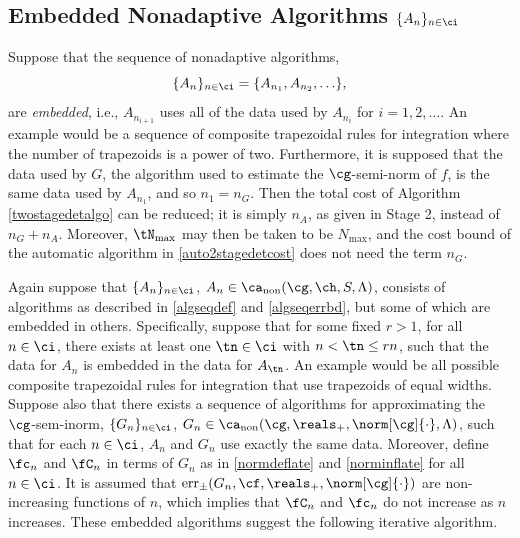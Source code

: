 \documentclass[]{elsarticle}
\DeclareMathOperator{\fix}{non}
\DeclareMathOperator{\err}{err}
\theoremstyle{definition}
\theoremstyle{remark}
\begin{document}
\subsection{Embedded Nonadaptive Algorithms $\{A_n\}_{n \in \ci}$}

Suppose that the sequence of nonadaptive algorithms, 
\[
\{A_n\}_{n \in \ci} = \{A_{n_1}, A_{n_2}, \ldots \}, 
\]
are \emph{embedded}, i.e., $A_{n_{i+1}}$ uses all of the data used by $A_{n_{i}}$ for $i=1, 2, \ldots$.  An example would be a sequence of composite trapezoidal rules for integration where the number of trapezoids is a power of two. Furthermore, it is supposed that the data used by $G$, the algorithm used to estimate the $\cg$-semi-norm of $f$, is the same data used by $A_{n_1}$, and so $n_1=n_G$.  Then the total cost of Algorithm \ref{twostagedetalgo} can be reduced; it is simply $n_A$, as given in Stage 2, instead of $n_G+n_A$.  Moreover, $\tN_{\max}$ may then be taken to be $N_{\max}$, and the cost bound of the automatic algorithm in \eqref{auto2stagedetcost} does not need the term $n_G$.

Again suppose that $\{A_n\}_{n \in \ci}$, $A_n  \in \ca_{\fix}(\cg,\ch,S,\Lambda)$, consists of algorithms as described in  \eqref{algseqdef} and \eqref{algseqerrbd}, but some of which are embedded in others.  Specifically, suppose that for some fixed $r > 1$, for all $n \in \ci$, there exists at least one $\tn \in \ci$ with $n < \tn \le rn$, such that the data for $A_n$ is embedded in the data for $A_{\tn}$.  An example would be all possible composite trapezoidal rules for integration that use trapezoids of equal widths. Suppose also that there exists a sequence of algorithms for approximating the $\cg$-sem-inorm, $\{G_n\}_{n \in \ci}$, $G_n  \in \ca_{\fix}(\cg,\reals_+,\norm[\cg]{\cdot},\Lambda)$, such that for each $n \in \ci$, $A_n$ and $G_n$ use exactly the same data. Moreover, define $\fc_n$ and $\fC_n$ in terms of $G_n$ as in \eqref{normdeflate} and \eqref{norminflate} for all $n \in \ci$.
It is assumed that $\err_{\pm}(G_n,\cf,\reals_+,\norm[\cg]{\cdot})$ are non-increasing functions of $n$, which implies that $\fC_{n}$ and $\fc_n$ do not increase as $n$ increases. These embedded algorithms suggest the following iterative algorithm.
\end{document}
